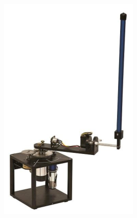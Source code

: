 \begin{figure}[H]
    \centering
    \begin{subfigure}{.4\textwidth}
        \centering
        \includegraphics[width=\textwidth]{eps/lab_2/quanser.eps}
        \caption{}
    \end{subfigure}\hfill
    \begin{subfigure}{.4\textwidth}

\end{subfigure}
\end{figure}
